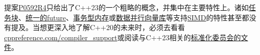 提案\href{http://www.open-std.org/jtc1/sc22/wg21/docs/papers/2019/p0592r4.html}{P0592R4}只给出了C++23的一个粗略的概念，并集中在主要特性上。诸如\href{ttps://www.modernescpp.com/index.php/task-blocks}{任务块}、\href{https://www.modernescpp.com/index.php/the-end-of-the-detour-unified-futures}{统一的future}、\href{https://www.modernescpp.com/index.php/transactional-memory}{事务型内存}或\href{https://en.cppreference.com/w/cpp/experimental/simd}{数据并行向量库}等支持\href{https://en.wikipedia.org/wiki/SIMD}{SIMD}的特性甚至都没有提及。当想更深入地了解C++20的未来时，必须去看看\href{https://en.cppreference.com/w/cpp/compiler_support}{cppreference.com/compiler\_support}或阅读与C++23相关的\href{http://www.open-std.org/jtc1/sc22/wg21/docs/papers/}{标准化委员会的文件}。















